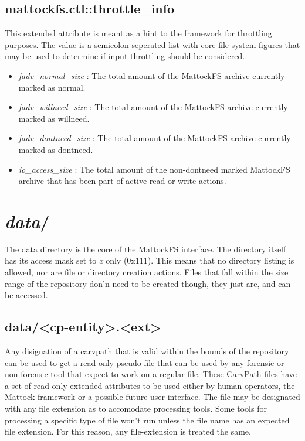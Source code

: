 \subsection{mattockfs.ctl::throttle\_info}
This extended attribute is meant as a hint to the framework for throttling purposes. The value is a semicolon seperated list with core file-system figures that may be used to determine if input throttling should be considered.
\begin{itemize}
\item \emph{fadv\_normal\_size} : The total amount of the MattockFS archive currently marked as normal.
\item \emph{fadv\_willneed\_size} : The total amount of the MattockFS archive currently marked as willneed.
\item \emph{fadv\_dontneed\_size} : The total amount of the MattockFS archive currently marked as dontneed.
\item \emph{io\_access\_size} : The total amount of the non-dontneed marked MattockFS archive that has been part of active read or write actions.
\end{itemize}
\section{\emph{data}/}
The data directory is the core of the MattockFS interface. The directory itself has its access mask set to \emph{x} only (0x111). This means that no directory listing is allowed, nor are file or directory creation actions. Files that fall within the size range of the repository don'n need to be created though, they just are, and can be accessed.
\subsection{data/<cp-entity>.<ext>}
Any disignation of a carvpath that is valid within the bounds of the repository can be used to get a read-only pseudo file that can be used by any forensic or non-forensic tool that expect to work on a regular file. These CarvPath files have a set of read only extended attributes to be used either by human operators, the Mattock framework or a possible future user-interface.
The file may be designated with any file extension as to accomodate processing tools. Some tools for processing a specific type of file won't run unless the file name has an expected file extension. For this reason, any file-extension is treated the same.
